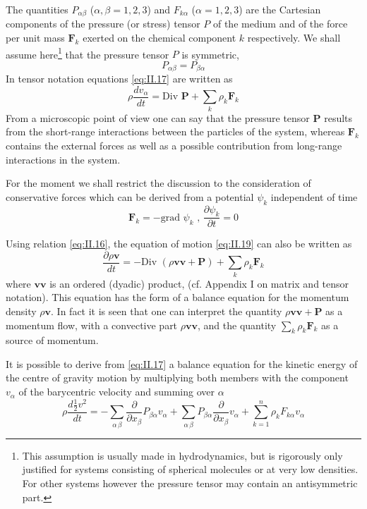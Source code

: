The quantities $P_{\alpha \beta}$ ($\alpha, \beta = 1,2,3$) and $F_{k \alpha}$ ($\alpha = 1,2,3$) are the Cartesian components of the pressure (or stress) tensor $P$ of the medium and of the force per unit mass $\bm{F}_k$ exerted on the chemical component $k$ respectively.
We shall assume here\footnote{This assumption is usually made in hydrodynamics, but is rigorously only justified for systems consisting of spherical molecules or at very low densities. For other systems however the pressure tensor may contain an antisymmetric part.} that the pressure tensor $P$ is symmetric,
\begin{equation}
P_{ \alpha \beta} = P_{\beta \alpha}
    \label{eq:II.18}
\end{equation}
In tensor notation equations \eqref{eq:II.17} are written as
\begin{equation}
\rho \frac{d v_{\alpha}}{d t} = \textrm{Div } \bm{P} + \sum_k \rho_k \bm{F}_k
    \label{eq:II.19}
\end{equation}
From a microscopic point of view one can say that the pressure tensor $\bm{P}$ results from the short-range interactions between the particles of the system, whereas $\bm{F}_k$ contains the external forces as well as a possible contribution from long-range interactions in the system.

For the moment we shall restrict the discussion to the consideration
of conservative forces which can be derived from a potential $\psi_k$ independent
of time
\begin{equation}
\bm{F}_k = - \textrm{grad } \psi_k \textrm{ ,   } \frac{\partial \psi_k}{\partial t} = 0
    \label{eq:II.20}
\end{equation}

Using relation \eqref{eq:II.16}, the equation of motion \eqref{eq:II.19} can also be written as
\begin{equation}
\frac{\partial \rho \bm{v}}{d t} = - \textrm{Div } \left(\rho \bm{v} \bm{v} + \bm{P} \right) + \sum_k \rho_k \bm{F}_k
    \label{eq:II.21}
\end{equation}
where $\bm{v} \bm{v}$ is an ordered (dyadic) product, (cf. Appendix I on matrix and tensor notation). This equation has the form of a balance equation for the momentum density $\rho \bm{v}$. In fact it is seen that one can interpret the quantity $\rho \bm{v} \bm{v} + \bm{P}$ as a momentum flow, with a convective part $\rho \bm{v} \bm{v}$, and the quantity $\sum_k \rho_k \bm{F}_k$ as a source of momentum.

It is possible to derive from \eqref{eq:II.17} a balance equation for the kinetic energy of the centre of gravity motion by multiplying both members with the component $v_{\alpha}$ of the barycentric velocity and summing over ${\alpha}$
\begin{equation}
\rho \frac{d \frac{1}{2} v^2}{d t} = - \sum_{\alpha\,\beta} \frac{\partial}{\partial x_{\beta}} P_{\beta \alpha} v_{\alpha} 
+
\sum_{\alpha\,\beta} P_{\beta \alpha} \frac{\partial}{\partial x_{\beta}} v_{\alpha}
+ 
\sum_{k=1}^{n} \rho_k F_{k \alpha} v_{\alpha}
    \label{eq:II.22}
\end{equation}

